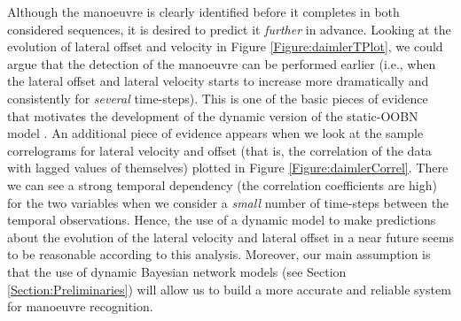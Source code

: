 Although the manoeuvre is clearly identified before it completes in both considered sequences, it is desired to predict it \textit{further} in advance. Looking at the evolution of lateral offset and velocity in Figure \ref{Figure:daimlerTPlot}, we could argue that the detection of the manoeuvre can be performed earlier (i.e., when the lateral offset and lateral velocity starts to increase more dramatically and consistently for \textit{several} time-steps). This is one of the basic pieces of evidence that motivates the development of the dynamic version of the static-OOBN model \cite{Weidl2014}. An additional piece of evidence appears when we look at the sample correlograms for lateral velocity and offset (that is, the correlation of the data with lagged values of themselves) plotted in Figure \ref{Figure:daimlerCorrel}. There we can see a strong temporal dependency (the correlation coefficients are high) for the two variables when we consider a \textit{small} number of time-steps between the temporal observations. Hence, the use of a dynamic model to make predictions about the evolution of the lateral velocity and lateral offset in a near future seems to be reasonable according to this analysis. Moreover, our main assumption is that the use of dynamic Bayesian network models (see Section \ref{Section:Preliminaries}) will allow us to build a more accurate and reliable system for manoeuvre recognition. 

